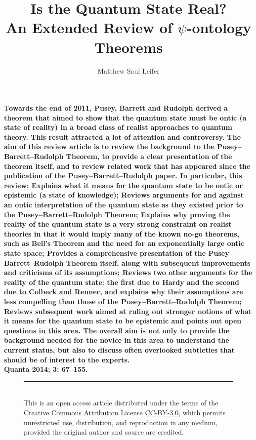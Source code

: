 \documentclass[DIV=calc,paper=a4,fontsize=11pt,twocolumn]{scrartcl} %
\title{Is the Quantum State Real?\\An Extended Review of $\psi$-ontology Theorems}					%
\author{Matthew Saul Leifer\\[8pt]}											%
\date{}																				%
\theoremstyle{definition}
\theoremstyle{plain}
\newcommand{\initial}[1]{%
\lettrine[lines=3,lhang=0.3,nindent=0em]{
\color[HTML]{31ADF3}
{\textsf{#1}}}{}}
\begin{document}
\maketitle
\thispagestyle{fancy} 			%
\initial{T}\textbf{owards the end of 2011, Pusey, Barrett and Rudolph derived a theorem that aimed to show that the quantum state must be ontic (a state of reality) in a broad class of realist approaches to quantum theory. This result attracted a lot of attention and controversy. The aim of this review article is to review the background to the Pusey--Barrett--Rudolph Theorem, to provide a clear presentation of the theorem itself, and to review related work that has appeared since the publication of the Pusey--Barrett--Rudolph paper. In particular, this review:
Explains what it means for the quantum state to be ontic or epistemic (a state of knowledge);
Reviews arguments for and against an ontic interpretation of the quantum state as they existed prior to the Pusey--Barrett--Rudolph Theorem;
Explains why proving the reality of the quantum state is a very strong constraint on realist theories in that it would imply many of the known no-go theorems, such as Bell's Theorem and the need for an exponentially large ontic state space;
Provides a comprehensive presentation of the Pusey--Barrett--Rudolph Theorem itself, along with subsequent improvements and criticisms of its assumptions;
Reviews two other arguments for the reality of the quantum state: the first due to Hardy and the second due to Colbeck and Renner, and explains why their assumptions are less compelling than those of the Pusey--Barrett--Rudolph Theorem;
Reviews subsequent work aimed at ruling out stronger notions of what it means for the quantum state to be epistemic and points out open questions in this area. The overall aim is not only to provide the background needed for the novice in this area to understand the current status, but also to discuss often overlooked subtleties that should be of interest to the experts.\\ Quanta 2014; 3: 67--155.}
\begin{figure}[b!]
\rule{245 pt}{0.5 pt}\\[3pt]
\footnotesize{This is an open access article distributed under the terms of the Creative Commons Attribution License \href{http://creativecommons.org/licenses/by/3.0/}{CC-BY-3.0}, which permits unrestricted use, distribution, and reproduction in any medium, provided the original author and source are credited.}
\end{figure}
\end{document}
